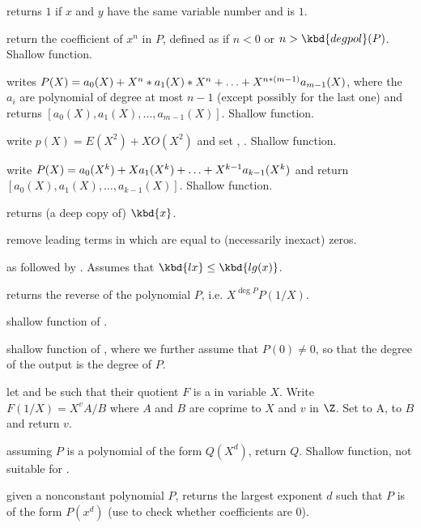  returns $1$ if $x$ and $y$
have the same variable number and  is $1$.


 return the coefficient of $x^n$ in $P$,
defined as  if $n < 0$ or $n > \kbd{degpol}(P)$. Shallow
function.

 writes
$P(X)=a_0(X)+X^n*a_1(X)*X^n+\ldots+X^{n*(m-1)}\*a_{m-1}(X)$,
where the $a_i$ are polynomial of degree at most $n-1$
(except possibly for the last one) and returns
$[a_0(X),a_1(X),\ldots,a_{m-1}(X)]$.  Shallow function.

 write $p(X) = E(X^2) +
X O(X^2)$ and set , .  Shallow function.

 write
$P(X)=a_0(X^k)+X\*a_1(X^k)+\ldots+X^{k-1}\*a_{k-1}(X^k)$ and return
$[a_0(X),a_1(X),\ldots,a_{k-1}(X)]$.  Shallow function.

 returns (a deep copy of) $\kbd{x}$.

 remove leading terms in  which are
equal to (necessarily inexact) zeros.

 as 
followed by . Assumes that $\kbd{lx} \leq
\kbd{lg(x)}$.

 returns the reverse of the polynomial
$P$, i.e. $X^{\deg P} P(1/X)$.

 shallow function of .

 shallow function of ,
where we further assume that $P(0)\neq 0$, so that the degree of the output
is the degree of $P$.

 let  and  be such that
their quotient $F$ is a  in variable $X$. Write $F(1/X) = X^v A/B$
where $A$ and $B$ are coprime to $X$ and $v$ in $\Z$. Set  to A,
 to $B$ and return $v$.

 assuming $P$ is a polynomial of the
form $Q(X^d)$, return $Q$. Shallow function, not suitable for
.

 given a nonconstant polynomial
$P$, returns the largest exponent $d$ such that $P$ is of the form $P(x^d)$
(use  to check whether coefficients are 0).

